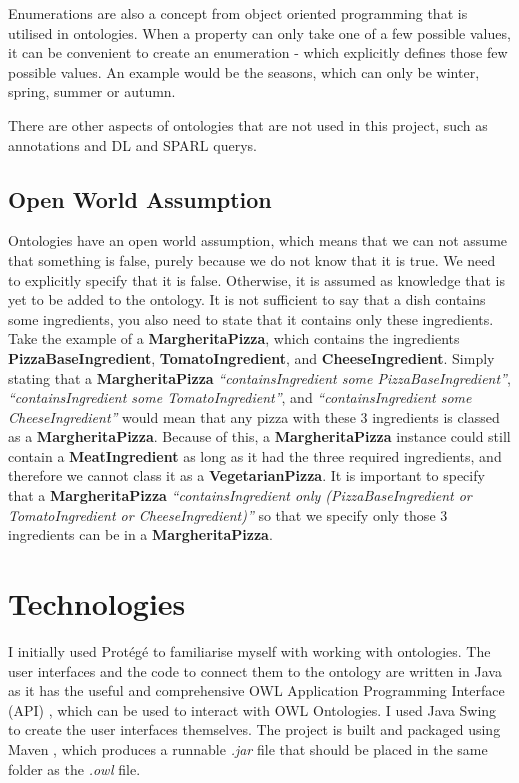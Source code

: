 Enumerations are also a concept from object oriented programming that is utilised in ontologies. When a property can only take one of a few possible values, it can be convenient to create an enumeration - which explicitly defines those few possible values. An example would be the seasons, which can only be winter, spring, summer or autumn.

There are other aspects of ontologies that are not used in this project, such as annotations and DL and SPARL querys.

\subsection{Open World Assumption}

Ontologies have an open world assumption, which means that we can not assume that something is false, purely because we do not know that it is true. We need to explicitly specify that it is false. Otherwise, it is assumed as knowledge that is yet to be added to the ontology. It is not sufficient to say that a dish contains some ingredients, you also need to state that it contains only these ingredients. Take the example of a \textbf{MargheritaPizza}, which contains the ingredients \textbf{PizzaBaseIngredient}, \textbf{TomatoIngredient}, and \textbf{CheeseIngredient}. Simply stating that a \textbf{MargheritaPizza} \textit{``containsIngredient some PizzaBaseIngredient''}, \textit{``containsIngredient some TomatoIngredient''}, and \textit{``containsIngredient some CheeseIngredient''} would mean that any pizza with these 3 ingredients is classed as a \textbf{MargheritaPizza}. Because of this, a \textbf{MargheritaPizza} instance could still contain a \textbf{MeatIngredient} as long as it had the three required ingredients, and therefore we cannot class it as a \textbf{VegetarianPizza}. It is important to specify that a \textbf{MargheritaPizza} \textit{``containsIngredient only (PizzaBaseIngredient or TomatoIngredient or CheeseIngredient)''} so that we specify only those 3 ingredients can be in a \textbf{MargheritaPizza}. 

\section{Technologies}

I initially used Protégé to familiarise myself with working with ontologies. The user interfaces and the code to connect them to the ontology are written in Java as it has the useful and comprehensive OWL Application Programming Interface (API) \cite{owl_api}, which can be used to interact with OWL Ontologies. I used Java Swing to create the user interfaces themselves. The project is built and packaged using Maven \cite{maven} , which produces a runnable \textit{.jar} file that should be placed in the same folder as the \textit{.owl} file.

